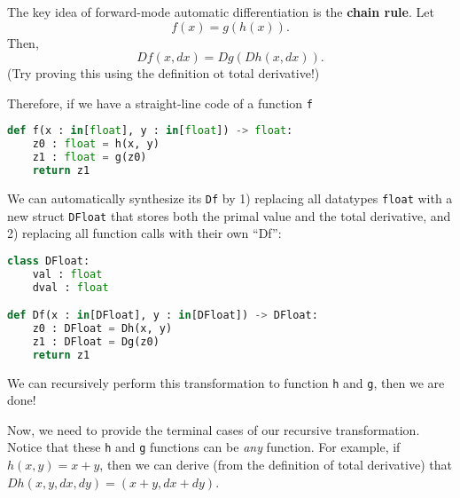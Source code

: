 The key idea of forward-mode automatic differentiation is the \textbf{chain rule}. Let
\begin{equation}
	f(x) = g(h(x)).
\end{equation}
Then,
\begin{equation}
	Df(x, dx) = Dg(Dh(x, dx)).
\end{equation}
(Try proving this using the definition ot total derivative!)

Therefore, if we have a straight-line code of a function \lstinline{f}
\begin{lstlisting}[language=Python]
def f(x : in[float], y : in[float]) -> float:
	z0 : float = h(x, y)
	z1 : float = g(z0)
	return z1
\end{lstlisting}
We can automatically synthesize its \lstinline{Df} by 1) replacing all datatypes \lstinline{float} with a new struct \lstinline{DFloat} that stores both the primal value and the total derivative, and 2) replacing all function calls with their own ``Df'':
\begin{lstlisting}[language=Python]
class DFloat:
	val : float
	dval : float

def Df(x : in[DFloat], y : in[DFloat]) -> DFloat:
	z0 : DFloat = Dh(x, y)
	z1 : DFloat = Dg(z0)
	return z1
\end{lstlisting}
We can recursively perform this transformation to function \lstinline{h} and \lstinline{g}, then we are done!

Now, we need to provide the terminal cases of our recursive transformation. Notice that these \lstinline{h} and \lstinline{g} functions can be \emph{any} function. For example, if $h(x, y) = x + y$, then we can derive (from the definition of total derivative) that $Dh(x, y, dx, dy) = (x + y, dx + dy)$. 

